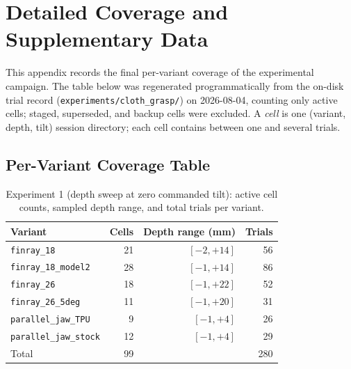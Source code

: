 \chapter{Detailed Coverage and Supplementary Data}
\label{app:coverage}

This appendix records the final per-variant coverage of the experimental
campaign. The table below was regenerated programmatically from the
on-disk trial record (\texttt{experiments/cloth\_grasp/}) on 2026-08-04,
counting only active cells; staged, superseded, and backup cells were
excluded.
A \emph{cell} is one (variant, depth, tilt) session directory; each cell
contains between one and several trials.

\section{Per-Variant Coverage Table}
\label{app:coverage-table}

\begin{table}[ht]
\centering
\caption[Experiment 1 coverage]{Experiment 1 (depth sweep at zero commanded
tilt): active cell counts, sampled depth range, and total trials per
variant.}
\label{tab:coverage-exp1}
\begin{tabular}{lrrr}
\toprule
Variant & Cells & Depth range (mm) & Trials \\
\midrule
\texttt{finray\_18}          & 21 & $[-2, +14]$ & 56 \\
\texttt{finray\_18\_model2}  & 28 & $[-1, +14]$ & 86 \\
\texttt{finray\_26}          & 18 & $[-1, +22]$ & 52 \\
\texttt{finray\_26\_5deg}    & 11 & $[-1, +20]$ & 31 \\
\texttt{parallel\_jaw\_TPU}  &  9 & $[-1, +4]$  & 26 \\
\texttt{parallel\_jaw\_stock}& 12 & $[-1, +4]$  & 29 \\
\midrule
Total                        & 99 &             & 280 \\
\bottomrule
\end{tabular}
\end{table}

